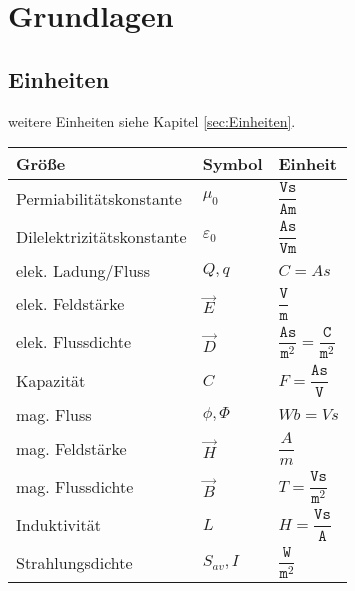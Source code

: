 \section{Grundlagen}
\subsection{Einheiten}
weitere Einheiten siehe Kapitel \ref{sec:Einheiten}.
\begin{table}[H]
	\renewcommand{\arraystretch}{2.15}
\begin{tabularx}{0.9\columnwidth}{lXl}
	Größe & Symbol & Einheit\\
	\hline
	Permiabilitätskonstante & $\mu_0$ &  $\dfrac{\texttt{Vs}}{\texttt{Am}}$\\
	\hline
	Dilelektrizitätskonstante & $\varepsilon_0$ &  $\dfrac{\texttt{As}}{\texttt{Vm}}$\\
		\hline
	elek. Ladung/Fluss & $ Q, q $ & $ C=As $\\
	\hline
	elek. Feldstärke & $ \vec{E} $ & $\dfrac{\texttt{V}}{\texttt{m}}$\\
	\hline
	elek. Flussdichte & $ \vec{D} $ & $\dfrac{\texttt{As}}{\texttt{m}^2}=\dfrac{\texttt{C}}{\texttt{m}^2}$\\
	\hline
	Kapazität & $C$ &  $F= \dfrac{\texttt{As}}{\texttt{V}}$\\
		\hline
	mag. Fluss& $\phi, \Phi$ &  $Wb = Vs$\\
		\hline
	mag. Feldstärke & $\vec{H}$ &  $\dfrac{A}{m}$\\
		\hline
	mag. Flussdichte & $\vec{B}$ &  $T = \dfrac{\texttt{Vs}}{\texttt{m}^2}$\\
	\hline
	Induktivität & $L$ &  $H = \dfrac{\texttt{Vs}}{\texttt{A}}$\\
		\hline
	Strahlungsdichte & $S_{av}, I$ &  $\dfrac{\texttt{W}}{\texttt{m}^2}$\\
				

\end{tabularx}
\end{table}
